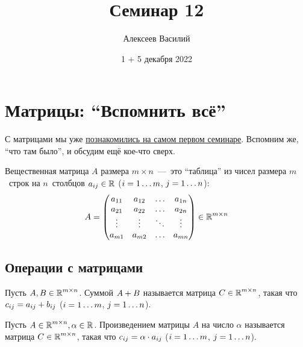 \documentclass[a4paper,12pt]{article}
\author{Алексеев Василий}
\title{Семинар 12}
\date{1 + 5 декабря 2022}
\theoremstyle{remark}
\begin{document}
  \maketitle
  
  \tableofcontents

  \thispagestyle{empty}
  
  \newpage
  


  \section{Матрицы: ``Вспомнить всё''}
  
  С матрицами мы уже \href{https://github.com/Alvant/GeomeSeminare/tree/master2022/seminars/geome/seminar01}{познакомились на самом первом семинаре}.
  Вспомним же, ``что там было'', и обсудим ещё кое-что сверх.
  
  \bigskip
  
  Вещественная матрица $A$ размера $m \times n$~---~это ``таблица'' из чисел размера $m$~строк на $n$~столбцов $a_{ij} \hm\in \RR$ ($i \hm= 1 \ldots m$, $j \hm= 1 \ldots n$):
  \[
    A = \begin{pmatrix}
      a_{11} & a_{12} & \ldots & a_{1n}\\
      a_{21} & a_{22} & \ldots & a_{2n}\\
      \vdots & \vdots & \ddots & \vdots\\
      a_{m1} & a_{m2} & \ldots & a_{mn}
    \end{pmatrix} \in \operatorname{\mathbb R}^{m \times n}
  \]
  
  
  \subsection{Операции с матрицами}
  
  \begin{definition}
    Пусть $A, B \in \operatorname{\mathbb R}^{m \times n}$.
    Суммой $A \hm+ B$ называется матрица $C \hm\in \RR^{m \times n}$, такая что
    $c_{ij} \hm= a_{ij} + b_{ij}$ ($i \hm= 1 \ldots m$, $j \hm= 1 \ldots n$).
  \end{definition}
  
  \begin{definition}
    Пусть $A \in \operatorname{\mathbb R}^{m \times n}, \alpha \in \operatorname{\mathbb R}$.
    Произведением матрицы $A$ на число $\alpha$ называется матрица $C \hm\in \RR^{m \times n}$, такая что
    $c_{ij} \hm= \alpha \cdot a_{ij}$ ($i \hm= 1 \ldots m$, $j \hm= 1 \ldots n$).
  \end{definition}
  
\end{document}
